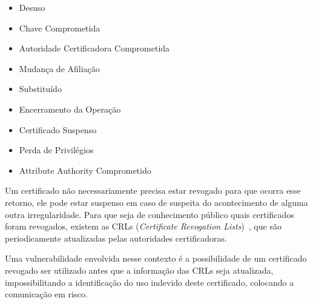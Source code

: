 	\begin{itemize}
		\item Desuso
		\item Chave Comprometida
		\item Autoridade Certificadora Comprometida
		\item Mudança de Afiliação
		\item Substituído
		\item Encerramento da Operação
		\item Certificado Suspenso
		\item Perda de Privilégios
		\item Attribute Authority Comprometido
	\end{itemize}

	Um certificado não necessariamente precisa estar revogado para que ocorra esse retorno, ele pode estar suspenso em caso de suspeita do acontecimento de alguma outra irregularidade. Para que seja de conhecimento público quais certificados foram revogados, existem as CRLs (\textit{Certificate Revogation Lists})~\cite{RFC5280}, que são periodicamente atualizadas pelas autoridades certificadoras.

	Uma vulnerabilidade envolvida nesse contexto é a possibilidade de um certificado revogado ser utilizado antes que a informação das CRLs seja atualizada, impossibilitando a identificação do uso indevido deste certificado, colocando a comunicação em risco.
